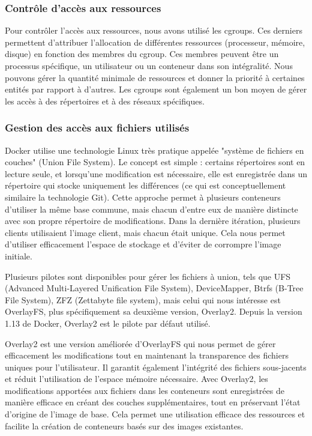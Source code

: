 \documentclass[a11paper, 11pt]{article}
\newcommand{\todo}[1]{\textcolor{orange}{\textbf{TODO}: #1}}
\begin{document}
\subsubsection{Contrôle d'accès aux ressources}

Pour contrôler l'accès aux ressources, nous avons utilisé les cgroups. Ces
derniers permettent d'attribuer l'allocation de différentes ressources
(processeur, mémoire, disque) en fonction des membres du cgroup. Ces membres
peuvent être un processus spécifique, un utilisateur ou un conteneur dans son
intégralité. Nous pouvons gérer la quantité minimale de ressources et donner la
priorité à certaines entités par rapport à d'autres. Les cgroups sont également
un bon moyen de gérer les accès à des répertoires et à des réseaux spécifiques.

\subsubsection{Gestion des accès aux fichiers utilisés}


Docker utilise une technologie Linux très pratique appelée "système de fichiers
en couches" (Union File System). Le concept est simple : certains répertoires
sont en lecture seule, et lorsqu'une modification est nécessaire, elle est
enregistrée dans un répertoire qui stocke uniquement les différences (ce qui
est conceptuellement similaire la technologie Git). Cette approche permet à
plusieurs conteneurs d'utiliser la même base commune, mais chacun d'entre eux
de manière distincte avec son propre répertoire de modifications. Dans la
dernière itération, plusieurs clients utilisaient l'image client, mais chacun
était unique. Cela nous permet d'utiliser efficacement l'espace de stockage et
d'éviter de corrompre l'image initiale.



Plusieurs pilotes sont disponibles pour gérer les fichiers à union, tels que
UFS (Advanced Multi-Layered Unification File System), DeviceMapper, Btrfs
(B-Tree File System), ZFZ (Zettabyte file system), mais celui qui nous
intéresse est OverlayFS, plus spécifiquement sa deuxième version, Overlay2.
Depuis la version 1.13 de Docker, Overlay2 est le pilote par défaut utilisé.

Overlay2 est une version améliorée d'OverlayFS qui nous permet de gérer
efficacement les modifications tout en maintenant la transparence des fichiers
uniques pour l'utilisateur. Il garantit également l'intégrité des fichiers
sous-jacents et réduit l'utilisation de l'espace mémoire nécessaire. Avec
Overlay2, les modifications apportées aux fichiers dans les conteneurs sont
enregistrées de manière efficace en créant des couches supplémentaires, tout en
préservant l'état d'origine de l'image de base. Cela permet une utilisation
efficace des ressources et facilite la création de conteneurs basés sur des
images existantes.
\end{document}
